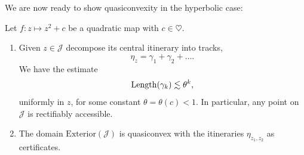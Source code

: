 We are now ready to show quasiconvexity in the hyperbolic case:

\begin{theorem}  Let $f:z \mapsto z^2+c$ be a quadratic map with $c \in \heartsuit$. \leavevmode
\begin{enumerate}[label=\normalfont(\roman*)]

\item Given $z\in\mathcal{J}$ decompose its central itinerary into tracks, 
\begin{equation*}
\eta_z = \gamma _1 +\gamma_2 +\dots.
\end{equation*}
We have the estimate
\begin{equation*}
\operatorname{Length}(\gamma_{k})\lesssim\theta^{k},
\end{equation*}
uniformly in $z$, for some constant $\theta=\theta(c)<1$. 
In particular, any point on \(\mathcal{J}\) is rectifiably accessible.

\item The domain $\mathrm{Exterior}(\mathcal{J})$ is quasiconvex with the itineraries $\eta_{z_1,z_2}$ as certificates.
	\end{enumerate}
\end{theorem}

